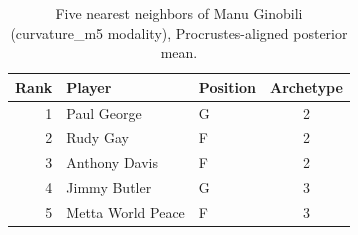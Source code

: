 \begin{table}[htbp]
  \centering\small
  \begin{tabular}{rllc}
    \toprule
    Rank & Player & Position & Archetype \\
    \midrule
    1 & Paul George & G & 2 \\
    2 & Rudy Gay & F & 2 \\
    3 & Anthony Davis & F & 2 \\
    4 & Jimmy Butler & G & 3 \\
    5 & Metta World Peace & F & 3 \\
    \bottomrule
  \end{tabular}
  \caption{Five nearest neighbors of Manu Ginobili (curvature_m5 modality), Procrustes-aligned posterior mean.}
  \label{tab:Manu_Ginobili_neighbors_curvature_m5}
\end{table}

